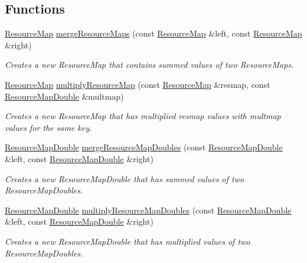 \subsection*{Functions}
\begin{DoxyCompactItemize}
\item 
\hyperlink{namespaceCourse_ab9a46ed9cd00485e318e5731ea2f78d9}{Resource\-Map} \hyperlink{namespaceCourse_ad07efc9b36b8b5bc7b2ed80414709a24}{merge\-Resource\-Maps} (const \hyperlink{namespaceCourse_ab9a46ed9cd00485e318e5731ea2f78d9}{Resource\-Map} \&left, const \hyperlink{namespaceCourse_ab9a46ed9cd00485e318e5731ea2f78d9}{Resource\-Map} \&right)
\begin{DoxyCompactList}\small\item\em Creates a new Resource\-Map that contains summed values of two Resource\-Maps. \end{DoxyCompactList}\item 
\hyperlink{namespaceCourse_ab9a46ed9cd00485e318e5731ea2f78d9}{Resource\-Map} \hyperlink{namespaceCourse_a04e0d37a3018429b9523ee3b70f0c911}{multiply\-Resource\-Map} (const \hyperlink{namespaceCourse_ab9a46ed9cd00485e318e5731ea2f78d9}{Resource\-Map} \&resmap, const \hyperlink{namespaceCourse_a0b96bae1a664dde34efbb1b42dea615e}{Resource\-Map\-Double} \&multmap)
\begin{DoxyCompactList}\small\item\em Creates a new Resource\-Map that has multiplied resmap values with multmap values for the same key. \end{DoxyCompactList}\item 
\hyperlink{namespaceCourse_a0b96bae1a664dde34efbb1b42dea615e}{Resource\-Map\-Double} \hyperlink{namespaceCourse_a2a27717372096871145e65bd34313653}{merge\-Resource\-Map\-Doubles} (const \hyperlink{namespaceCourse_a0b96bae1a664dde34efbb1b42dea615e}{Resource\-Map\-Double} \&left, const \hyperlink{namespaceCourse_a0b96bae1a664dde34efbb1b42dea615e}{Resource\-Map\-Double} \&right)
\begin{DoxyCompactList}\small\item\em Creates a new Resource\-Map\-Double that has summed values of two Resource\-Map\-Doubles. \end{DoxyCompactList}\item 
\hyperlink{namespaceCourse_a0b96bae1a664dde34efbb1b42dea615e}{Resource\-Map\-Double} \hyperlink{namespaceCourse_af4d7e6cd8b320d361f8e748b92fd75ea}{multiply\-Resource\-Map\-Doubles} (const \hyperlink{namespaceCourse_a0b96bae1a664dde34efbb1b42dea615e}{Resource\-Map\-Double} \&left, const \hyperlink{namespaceCourse_a0b96bae1a664dde34efbb1b42dea615e}{Resource\-Map\-Double} \&right)
\begin{DoxyCompactList}\small\item\em Creates a new Resource\-Map\-Double that has multiplied values of two Resource\-Map\-Doubles. \end{DoxyCompactList}\end{DoxyCompactItemize}
